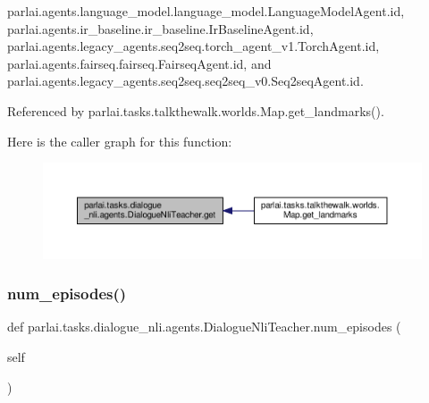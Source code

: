 parlai.\+agents.\+language\+\_\+model.\+language\+\_\+model.\+Language\+Model\+Agent.\+id, parlai.\+agents.\+ir\+\_\+baseline.\+ir\+\_\+baseline.\+Ir\+Baseline\+Agent.\+id, parlai.\+agents.\+legacy\+\_\+agents.\+seq2seq.\+torch\+\_\+agent\+\_\+v1.\+Torch\+Agent.\+id, parlai.\+agents.\+fairseq.\+fairseq.\+Fairseq\+Agent.\+id, and parlai.\+agents.\+legacy\+\_\+agents.\+seq2seq.\+seq2seq\+\_\+v0.\+Seq2seq\+Agent.\+id.



Referenced by parlai.\+tasks.\+talkthewalk.\+worlds.\+Map.\+get\+\_\+landmarks().

Here is the caller graph for this function\+:
\nopagebreak
\begin{figure}[H]
\begin{center}
\leavevmode
\includegraphics[width=350pt]{classparlai_1_1tasks_1_1dialogue__nli_1_1agents_1_1DialogueNliTeacher_aa3dfbefa7098aa0336896dd7ac5698b9_icgraph}
\end{center}
\end{figure}
\mbox{\label{classparlai_1_1tasks_1_1dialogue__nli_1_1agents_1_1DialogueNliTeacher_a1277b756af5d3ca234c77526a7bfb5e2}} 
\subsubsection{\texorpdfstring{num\+\_\+episodes()}{num\_episodes()}}
{\footnotesize\ttfamily def parlai.\+tasks.\+dialogue\+\_\+nli.\+agents.\+Dialogue\+Nli\+Teacher.\+num\+\_\+episodes (\begin{DoxyParamCaption}\item[{}]{self }\end{DoxyParamCaption})}



